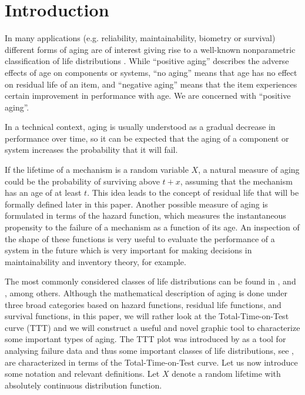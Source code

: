 \documentclass[preprint,12pt]{elsarticle}
\begin{document}
\linenumbers

\bigskip

\section{Introduction}
In many applications (e.g. reliability, maintainability, biometry or survival) different forms of aging are of interest giving rise to a well-known nonparametric classification of life distributions \cite{BP75}. While  ``positive aging'' describes the adverse effects of age on components or systems,  ``no aging'' means that age has no effect on residual life of an item, and  ``negative aging'' means that the item experiences certain improvement in performance with age. We are concerned with ``positive aging''.%

In a technical context, aging is usually understood as a gradual decrease in performance over time, so it can be expected that the aging of a component or system increases the probability that it will fail. 

If the lifetime of a mechanism is a random variable $ X $, a natural measure of aging could be the probability of surviving above $ t + x $, assuming that the mechanism has an age of at least $ t $. This idea leads to the concept of residual life that will be formally defined later in this paper.
Another possible measure of aging is formulated in terms of the hazard function, which measures the  instantaneous propensity to the failure of a mechanism as a function of  its age. An inspection of the shape of these functions is very useful to evaluate the performance of a system in the future which is very important for making decisions in maintainability and inventory theory, for example. 

The most commonly considered classes of life distributions can be found in \cite{BP75}, \cite{DKS86} and \cite{CW91}, among others. Although the mathematical description of aging is done under three broad categories based on hazard functions, residual life functions, and survival functions, in this paper, we will rather look at the Total-Time-on-Test curve (TTT) and we will construct a useful and novel graphic tool to characterize some important types of aging.  The TTT plot was introduced by \cite{BC75} as a tool for analysing failure data and thus some important classes of life distributions, see \cite{BK84}, are characterized in terms of the Total-Time-on-Test curve. Let us now introduce some notation and relevant definitions. Let $X$ denote a random lifetime with absolutely continuous distribution function. 
\end{document}
